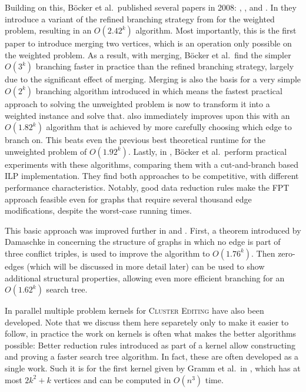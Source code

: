 \documentclass{article}
\theoremstyle{definition}
\begin{document}
Building on this, Böcker et al.\ published several papers in 2008: \cite{AnApproach},
\cite{GoingWeighted}, and \cite{ExactAlgos}. In \cite{AnApproach} they introduce a variant of the
refined branching strategy from \cite{Gramm} for the weighted problem, resulting in an $O(2.42^k)$
algorithm. Most importantly, this is the first paper to introduce merging two vertices, which is an
operation only possible on the weighted problem. As a result, with merging, Böcker et al.\ find the
simpler $O(3^k)$ branching faster in practice than the refined branching strategy, largely due to
the significant effect of merging. Merging is also the basis for a very simple $O(2^k)$ branching
algorithm introduced in \cite{GoingWeighted} which means the fastest practical approach to solving the
unweighted problem is now to transform it into a weighted instance and solve that.
\cite{GoingWeighted} also immediately improves upon this with an $O(1.82^k)$ algorithm that is
achieved by more carefully choosing which edge to branch on. This beats even the previous best
theoretical runtime for the unweighted problem of $O(1.92^k)$. Lastly, in \cite{ExactAlgos}, Böcker
et al.\ perform practical experiments with these algorithms, comparing them with a cut-and-branch
based ILP implementation. They find both approaches to be competitive, with different performance
characteristics. Notably, good data reduction rules make the FPT approach feasible even for graphs
that require several thousand edge modifications, despite the worst-case running times.

This basic approach was improved further in \cite[Böcker and Damaschke, 2011]{EvenFaster} and
\cite[Böcker, 2012]{GoldenRatio}. First, a theorem introduced by Damaschke in \cite{BoundedDegree}
concerning the structure of graphs in which no edge is part of three conflict triples, is used to
improve the algorithm to $O(1.76^k)$. Then zero-edges (which will be discussed in more detail later)
can be used to show additional structural properties, allowing even more efficient branching for an
$O(1.62^k)$ search tree.

In parallel multiple problem kernels for \textsc{Cluster Editing} have also been developed. Note
that we discuss them here separetely only to make it easier to follow, in practice the work on
kernels is often what makes the better algorithms possible: Better reduction rules introduced as
part of a kernel allow constructing and proving a faster search tree algorithm. In fact, these are
often developed as a single work. Such it is for the first kernel given by Gramm et al.\ in
\cite{Gramm}, which has at most $2k^2 + k$ vertices and can be computed in $O(n^3)$ time.
\end{document}
